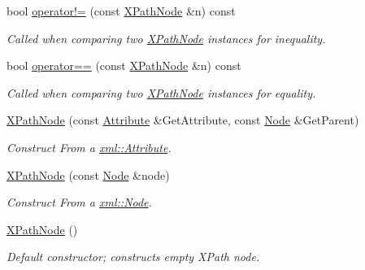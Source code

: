 \begin{DoxyCompactItemize}
bool \hyperlink{classphys_1_1xml_1_1XPathNode_a121ba0e04b6619f45c5392374f2dc98d}{operator!=} (const \hyperlink{classphys_1_1xml_1_1XPathNode}{XPathNode} \&n) const 
\begin{DoxyCompactList}\small\item\em Called when comparing two \hyperlink{classphys_1_1xml_1_1XPathNode}{XPathNode} instances for inequality. \item\end{DoxyCompactList}\item 
bool \hyperlink{classphys_1_1xml_1_1XPathNode_ab13702ded8707602871596e4f34e8302}{operator==} (const \hyperlink{classphys_1_1xml_1_1XPathNode}{XPathNode} \&n) const 
\begin{DoxyCompactList}\small\item\em Called when comparing two \hyperlink{classphys_1_1xml_1_1XPathNode}{XPathNode} instances for equality. \item\end{DoxyCompactList}\item 
\hyperlink{classphys_1_1xml_1_1XPathNode_a3f9446596022b6e0ab77afc2748c98e0}{XPathNode} (const \hyperlink{classphys_1_1xml_1_1Attribute}{Attribute} \&GetAttribute, const \hyperlink{classphys_1_1xml_1_1Node}{Node} \&GetParent)
\begin{DoxyCompactList}\small\item\em Construct From a \hyperlink{classphys_1_1xml_1_1Attribute}{xml::Attribute}. \item\end{DoxyCompactList}\item 
\hyperlink{classphys_1_1xml_1_1XPathNode_ab70dcfefef2107eca2d1932faada475e}{XPathNode} (const \hyperlink{classphys_1_1xml_1_1Node}{Node} \&node)
\begin{DoxyCompactList}\small\item\em Construct From a \hyperlink{classphys_1_1xml_1_1Node}{xml::Node}. \item\end{DoxyCompactList}\item 
\hypertarget{classphys_1_1xml_1_1XPathNode_a5e4ac19a93960347f4ce9dc05c88e26d}{
\hyperlink{classphys_1_1xml_1_1XPathNode_a5e4ac19a93960347f4ce9dc05c88e26d}{XPathNode} ()}
\label{classphys_1_1xml_1_1XPathNode_a5e4ac19a93960347f4ce9dc05c88e26d}

\begin{DoxyCompactList}\small\item\em Default constructor; constructs empty XPath node. \item\end{DoxyCompactList}\end{DoxyCompactItemize}



